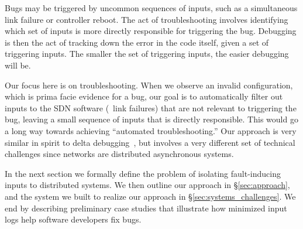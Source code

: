 Bugs may be triggered by uncommon sequences of inputs, such as a simultaneous link failure or controller reboot.
The act of troubleshooting involves identifying which set of inputs is more directly responsible for triggering the bug.
Debugging is then the act of tracking down the error in the code itself, given a
set of triggering inputs.
The smaller the set of triggering inputs, the easier debugging will be.

Our focus here is on troubleshooting. When we observe an invalid
configuration,
which is prima facie evidence for a bug, our goal is
to automatically filter out inputs to the SDN software (\eg~link failures) 
that are not relevant to triggering the bug, leaving a small sequence of inputs
that is directly responsible.
This would go a long way towards achieving ``automated troubleshooting.'' Our approach is very similar in spirit to delta debugging~\cite{Zeller:1999:YMP:318773.318946}, but involves a very different set of technical challenges since networks are distributed asynchronous systems.

In the next section we formally define the problem of isolating fault-inducing
inputs to distributed systems. We then outline our approach in
\S\ref{sec:approach}, and the
system we built to realize our approach in \S\ref{sec:systems_challenges}.
We end by describing preliminary case studies that illustrate how minimized
input logs help software developers fix bugs.
